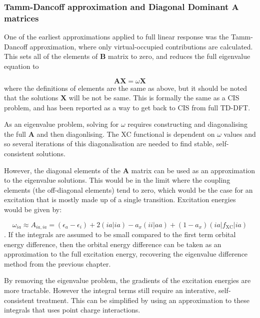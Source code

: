\subsubsection{Tamm-Dancoff approximation and Diagonal Dominant $\mathbf{A}$ matrices}
\label{subsubsec:Tamm_Dancoff}

One of the earliest approximations applied to full linear response was the Tamm-Dancoff
approximation, where only virtual-occupied contributions are calculated. This sets
all of the elements of $\mathbf{B}$ matrix to zero, and reduces the full eigenvalue 
equation to 

\begin{equation}
\mathbf{A} \mathbf{X} = \omega \mathbf{X}
\end{equation}
%
where the definitions of elements are the same as above, but it should be noted 
that the solutions $\mathbf{X}$ will be not be same. This is formally the same as
a CIS problem, and has been reported as a way to get back to CIS from full
TD-DFT.

As an eigenvalue problem, solving for $\omega$ requires constructing and diagonalising
the full $\mathbf{A}$ and then diagonlising. The XC functional is dependent on 
$\omega$ values and so several iterations of this diagonalisation are needed to
find stable, self-consistent solutions.

However, the diagonal elements of the $\mathbf{A}$ matrix can be used as an approximation
to the eigenvalue solutions. This would be in the limit where the coupling elements
(the off-diagonal elements) tend to zero, which would be the case for an excitation
that is mostly made up of a single transition. Excitation energies would be given
by:

\begin{equation}
\omega_{ia} \approx A_{ia, ia} = \left( \epsilon_a - \epsilon_i \right) + 2\left(ia|ia\right) - a_x\left(ii|aa\right) + (1- a_x)\left(ia|f_{\text{XC}}|ia\right) 
\label{eq:diag_dom}
\end{equation}
%
. If the integrals are assumed to be small compared to the first term orbital energy
difference, then the orbital energy difference can be taken as an approximation 
to the full excitation energy, recovering the eigenvalue difference method from
the previous chapter.

By removing the eigenvalue problem, the gradients of the excitation energies are
more tractable. However the integral terms still require an interative, self-consistent
treatment. This can be simplified by using an approximation to these integrals that
uses point charge interactions.

